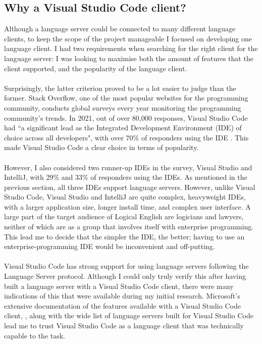 \documentclass[../main.tex]{subfiles}
\begin{document}
\subsection{Why a Visual Studio Code client?}
Although a language server could be connected to many different language clients, to keep the scope of the project manageable I focused on developing one language client. I had two requirements when searching for the right client for the language server: I was looking to maximise both the amount of features that the client supported, and the popularity of the language client. 
\\
\\
Surprisingly, the latter criterion proved to be a lot easier to judge than the former. Stack Overflow, one of the most popular websites for the programming community, conducts global surveys every year monitoring the programming community's trends. In 2021, out of over 80,000 responses, Visual Studio Code had ``a significant lead as the Integrated Development Environment (IDE) of choice across all developers", with over 70\% of responders using the IDE  \cite{ide_rankings}. This made Visual Studio Code a clear choice in terms of popularity. 
\\
\\
However, I also considered two runner-up IDEs in the survey, Visual Studio and IntelliJ, with 29\% and 33\% of responders using the IDEs. As mentioned in the previous section, all three IDEs support language servers. However, unlike Visual Studio Code, Visual Studio and IntelliJ are quite complex, heavyweight IDEs, with a larger application size, longer install time, and complex user interface. A large part of the target audience of Logical English are logicians and lawyers, neither of which are as a group that involves itself with enterprise programming. This lead me to decide that the simpler the IDE, the better; having to use an enterprise-programming IDE would be inconvenient and off-putting. 
\\
\\
Visual Studio Code has strong support for using language servers following the Language Server protocol. Although I could only truly verify this after having built a language server with a Visual Studio Code client, there were many indications of this that were available during my initial research. Microsoft's extensive documentation of the features available with a Visual Studio Code client, \cite{vsc_langserver_features}, along with the wide list of language servers built for Visual Studio Code \cite{open_source_language_servers} lead me to trust Visual Studio Code as a language client that was technically capable to the task. 
\end{document}
